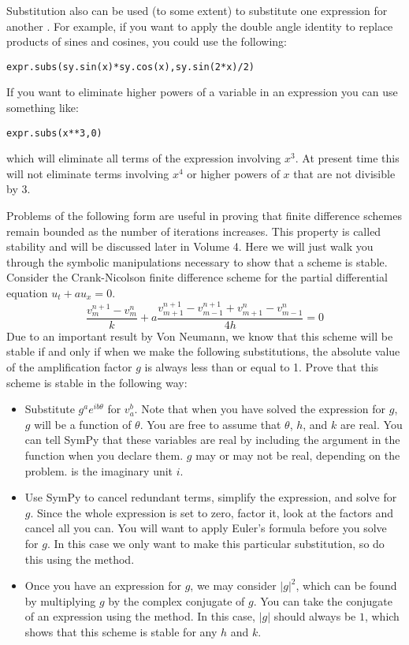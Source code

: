 Substitution also can be used (to some extent) to substitute one expression for another .
For example, if you want to apply the double angle identity to replace products of sines and cosines, you could use the following:
\begin{lstlisting}
expr.subs(sy.sin(x)*sy.cos(x),sy.sin(2*x)/2)
\end{lstlisting}
If you want to eliminate higher powers of a variable in an expression you can use something like:
\begin{lstlisting}
expr.subs(x**3,0)
\end{lstlisting}
which will eliminate all terms of the expression involving $x^3$.
At present time this will not eliminate terms involving $x^4$ or higher powers of $x$ that are not divisible by 3.

\begin{problem}
Problems of the following form are useful in proving that finite difference schemes remain bounded as the number of iterations increases.
This property is called stability and will be discussed later in Volume 4.
Here we will just walk you through the symbolic manipulations necessary to show that a scheme is stable.
Consider the Crank-Nicolson finite difference scheme for the partial differential equation $u_t+a u_x=0$.
$$\frac{v_{m}^{n+1}-v_{m}^{n}}{k}+a \frac{v_{m+1}^{n+1}-v_{m-1}^{n+1}+v_{m+1}^{n}-v_{m-1}^{n}}{4h}=0$$
Due to an important result by Von Neumann, we know that this scheme will be stable if and only if when we make the following substitutions, the absolute value of the amplification factor $g$ is always less than or equal to 1.
Prove that this scheme is stable in the following way:
\begin{itemize}
\item Substitute $g^a e^{i b \theta}$ for $v_a^b$.
Note that when you have solved the expression for $g$, $g$ will be a function of $\theta$.
You are free to assume that $\theta$, $h$, and $k$ are real.
You can tell SymPy that these variables are real by including the argument  in the  function when you declare them.
$g$ may or may not be real, depending on the problem.
 is the imaginary unit $i$.
\item Use SymPy to cancel redundant terms, simplify the expression, and solve for $g$.
Since the whole expression is set to zero, factor it, look at the factors and cancel all you can.
You will want to apply Euler's formula before you solve for $g$.
In this case we only want to make this particular substitution, so do this using the  method.
\item Once you have an expression for $g$, we may consider $|g|^2$, which can be found by multiplying $g$ by the complex conjugate of $g$. 
You can take the conjugate of an expression using the  method.
In this case, $|g|$ should always be $1$, which shows that this scheme is stable for any $h$ and $k$.
\end{itemize}
\end{problem}

